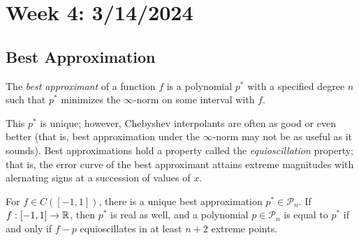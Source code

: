 \section{Week 4: 3/14/2024}

\subsection{Best Approximation}

\begin{dfn}
  The \emph{best approximant} of a function $f$ is a polynomial $p^*$ with a specified degree $n$ such that $p^*$ minimizes the $\infty$-norm on some interval with $f$. 
\end{dfn}
This $p^*$ is unique; however, Chebyshev interpolants are often as good or even better (that is, best approximation under the $\infty$-norm may not be as useful as it sounds). Best approximations hold a property called the \emph{equioscillation} property; that is, the error curve of the best approximant attains extreme magnitudes with alernating signs at a succession of values of $x$. 

\begin{theorem}
    For $f \in C([-1, 1])$, there is a unique best approximation $p^* \in \mathcal{P}_n$. If $f: [-1, 1] \rightarrow \mathbb{R}$, then $p^*$ is real as well, and a polynomial $p \in \mathcal{P}_n$ is equal to $p^*$ if and only if $f- p$ equioscillates in at least $n+2$ extreme points.
\end{theorem}


